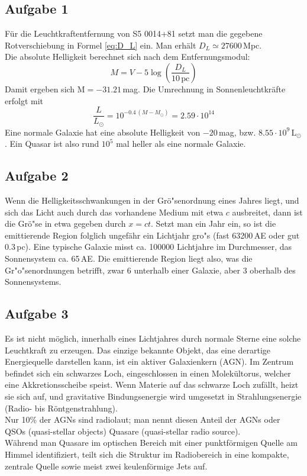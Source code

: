 \documentclass[12pt]{article}
\begin{document}
\subsection{Aufgabe 1}

F\"{u}r die Leuchtkraftentfernung von S5 0014+81 setzt man die gegebene Rotverschiebung in Formel \ref{eq:D_L} ein. Man erh\"{a}lt $D_L\simeq27600\,$Mpc. \\
Die absolute Helligkeit berechnet sich nach dem Entfernungsmodul:
\begin{equation} \label{eq:dist_mod}
	M=V-5 \log\left(\frac{D_L}{10\,\text{pc}}\right)
\end{equation}
Damit ergeben sich $\text{M} = -31.21\,$mag. Die Umrechnung in Sonnenleuchtkr\"{a}fte erfolgt mit
\begin{equation}
	\frac{L}{L_\odot} = 10^{-0.4\,(M-M_\odot)} = 2.59\cdot 10^{14}
\end{equation}
Eine normale Galaxie hat eine absolute Helligkeit von $-20\,$mag, bzw. $8.55\cdot 10^9\,\text{L}_\odot$. Ein Quasar ist also rund $10^5$ mal heller als eine normale Galaxie.
 
\subsection{Aufgabe 2}

Wenn die Helligkeitsschwankungen in der Gr\"{o}"senordnung eines Jahres liegt, und sich das Licht auch durch das vorhandene Medium mit etwa $c$ ausbreitet, dann ist die Gr\"{o}"se in etwa gegeben durch $x = ct$. Setzt man ein Jahr ein, so ist die emittierende Region folglich ungef\"{a}hr ein Lichtjahr gro"s (fast 63200\,AE oder gut 0.3\,pc). Eine typische Galaxie misst ca. 100000 Lichtjahre im Durchmesser, das Sonnensystem ca. 65\,AE. Die emittierende Region liegt also, was die Gr"{o}"senordnungen betrifft, zwar 6 unterhalb einer Galaxie, aber 3 oberhalb des Sonnensystems.

\subsection{Aufgabe 3} \label{a3}

Es ist nicht m\"{o}glich, innerhalb eines Lichtjahres durch normale Sterne eine solche Leuchtkraft zu erzeugen. Das einzige bekannte Objekt, das eine derartige Energiequelle darstellen kann, ist ein aktiver Galaxienkern (AGN). Im Zentrum befindet sich ein schwarzes Loch, eingeschlossen in einen Molek\"{u}ltorus, welcher eine Akkretionsscheibe speist. Wenn Materie auf das schwarze Loch zuf\"{a}llt, heizt sie sich auf, und gravitative Bindungsenergie wird umgesetzt in Strahlungsenergie (Radio- bis R\"{o}ntgenstrahlung). \\
Nur 10\% der AGNs sind radiolaut; man nennt diesen Anteil der AGNs oder QSOs (quasi-stellar objects) Quasare (quasi-stellar radio source).  \\
W\"{a}hrend man Quasare im optischen Bereich mit einer punktf\"{o}rmigen Quelle am Himmel identifiziert, teilt sich die Struktur im Radiobereich in eine kompakte, zentrale Quelle sowie meist zwei keulenf\"{o}rmige Jets auf. 
\end{document}
